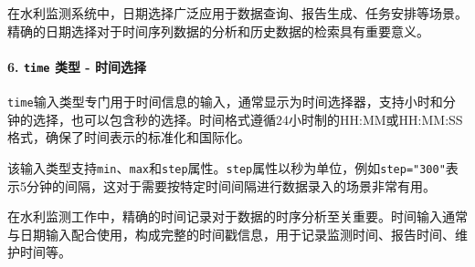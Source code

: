 在水利监测系统中，日期选择广泛应用于数据查询、报告生成、任务安排等场景。精确的日期选择对于时间序列数据的分析和历史数据的检索具有重要意义。

\begin{Shaded}
\begin{Highlighting}[]
\DataTypeTok{\textless{}}\OperatorTok{=}\DataTypeTok{\textgreater{}}\DataTypeTok{\textless{}/}\DataTypeTok{\textgreater{}}
\DataTypeTok{\textless{}}\OperatorTok{=}\OtherTok{ }
\OperatorTok{=}\OtherTok{ }
\OperatorTok{=}\OtherTok{ }
\OperatorTok{=}
\OperatorTok{=}\OtherTok{ }
\OperatorTok{=}
\DataTypeTok{\textgreater{}}
\end{Highlighting}
\end{Shaded}

\paragraph{\texorpdfstring{6. \texttt{time} 类型 - 时间选择}{6. time 类型 - 时间选择}}\label{time-ux7c7bux578b---ux65f6ux95f4ux9009ux62e9}

\texttt{time}输入类型专门用于时间信息的输入，通常显示为时间选择器，支持小时和分钟的选择，也可以包含秒的选择。时间格式遵循24小时制的HH:MM或HH:MM:SS格式，确保了时间表示的标准化和国际化。

该输入类型支持\texttt{min}、\texttt{max}和\texttt{step}属性。\texttt{step}属性以秒为单位，例如\texttt{step="300"}表示5分钟的间隔，这对于需要按特定时间间隔进行数据录入的场景非常有用。

在水利监测工作中，精确的时间记录对于数据的时序分析至关重要。时间输入通常与日期输入配合使用，构成完整的时间戳信息，用于记录监测时间、报告时间、维护时间等。

\begin{Shaded}
\begin{Highlighting}[]
\DataTypeTok{\textless{}}\OperatorTok{=}\DataTypeTok{\textgreater{}}\DataTypeTok{\textless{}/}\DataTypeTok{\textgreater{}}
\DataTypeTok{\textless{}}\OperatorTok{=}\OtherTok{ }
\OperatorTok{=}\OtherTok{ }
\OperatorTok{=}\OtherTok{ }
\OperatorTok{=}
\OperatorTok{=}
\OperatorTok{=}
\OperatorTok{=}
\DataTypeTok{\textgreater{}}  
\end{Highlighting}
\end{Shaded}

